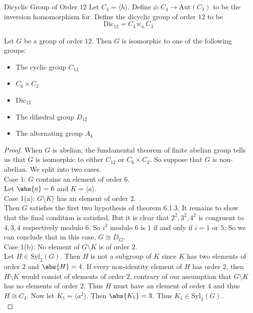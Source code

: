 \documentclass[a4paper]{article}
\begin{document}
\begin{defn}{Dicyclic Group of Order $12$}{} Let $C_4=\langle h\rangle$. Define $\phi:C_4\to\text{Aut}(C_3)$ to be the inversion homomorphism for. Define the dicyclic group of order $12$ to be $$\text{Dic}_{12}=C_4\ltimes_\phi C_3$$ 
\end{defn}

\begin{thm}{}{} Let $G$ be a group of order $12$. Then $G$ is isomorphic to one of the following groups: 
\begin{itemize}
\item The cyclic group $C_{12}$
\item $C_6\times C_2$
\item $\text{Dic}_{12}$
\item The dihedral group $D_{12}$
\item The alternating group $A_4$
\end{itemize} 
\begin{proof}
When $G$ is abelian, the fundamental theorem of finite abelian group tells us that $G$ is isomorphic to either $C_{12}$ or $C_6\times C_2$. So suppose that $G$ is non-abelian. We split into two cases. \\

Case 1: $G$ contains an element of order $6$. \\
Let $\abs{a}=6$ and $K=\langle a\rangle$. \\

Case 1(a): $G\setminus K\rangle$ has an element of order $2$. \\
Then $G$ satisfies the first two hypothesis of theorem 6.1.3. It remains to show that the final condition is satisfied. But it is clear that $2^2,3^2,4^2$ is congruent to $4,3,4$ respectively modulo $6$. So $i^2$ modulo $6$ is $1$ if and only if $i=1$ or $5$. So we can conclude that in this case, $G\cong D_{12}$. \\

Case 1(b): No element of $G\setminus K$ is of order $2$. \\
Let $H\in\text{Syl}_2(G)$. Then $H$ is not a subgroup of $K$ since $K$ has two elements of order $2$ and $\abs{H}=4$. If every non-identity element of $H$ has order $2$, then $H\setminus K$ would consist of elements of order $2$, contrary of our assumption that $G\setminus K$ has no elements of order $2$. Thus $H$ must have an element of order $4$ and thus $H\cong C_4$. Now let $K_1=\langle a^2\rangle$. Then $\abs{K_1}=3$. Thus $K_1\in\text{Syl}_3(G)$. \\


\end{proof}
\end{thm}
\end{document}

